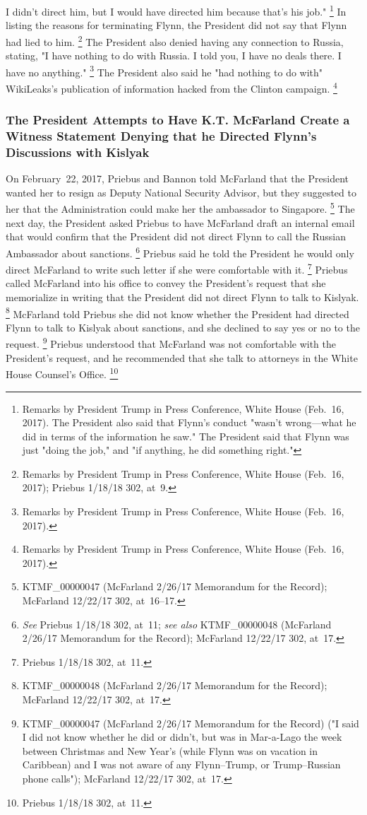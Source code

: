 I didn't direct him, but I would have directed him because that's his job."%
\footnote{Remarks by President Trump in Press Conference, White House (Feb.~16, 2017).
The President also said that Flynn's conduct "wasn't wrong---what he did in terms of the information he saw."
The President said that Flynn was just "doing the job," and "if anything, he did something right."}
In listing the reasons for terminating Flynn, the President did not say that Flynn had lied to him.%
\footnote{Remarks by President Trump in Press Conference, White House (Feb.~16, 2017);
Priebus 1/18/18 302, at~9.}
The President also denied having any connection to Russia, stating, "I have nothing to do with Russia.
I told you, I have no deals there.
I have no anything."%
\footnote{Remarks by President Trump in Press Conference, White House (Feb.~16, 2017).}
The President also said he "had nothing to do with" WikiLeaks's publication of information hacked from the Clinton campaign.%
\footnote{Remarks by President Trump in Press Conference, White House (Feb.~16, 2017).}

\subsubsection{The President Attempts to Have K.T. McFarland Create a Witness Statement Denying that he Directed Flynn's Discussions with Kislyak}

On February~22, 2017, Priebus and Bannon told McFarland that the President wanted her to resign as Deputy National Security Advisor, but they suggested to her that the Administration could make her the ambassador to Singapore.%
\footnote{KTMF\_00000047 (McFarland 2/26/17 Memorandum for the Record);
McFarland 12/22/17 302, at~16--17.}
The next day, the President asked Priebus to have McFarland draft an internal email that would confirm that the President did not direct Flynn to call the Russian Ambassador about sanctions.%
\footnote{\textit{See} Priebus 1/18/18 302, at~11;
\textit{see also} KTMF\_00000048 (McFarland 2/26/17 Memorandum for the Record);
McFarland 12/22/17 302, at~17.}
Priebus said he told the President he would only direct McFarland to write such letter if she were comfortable with it.%
\footnote{Priebus 1/18/18 302, at~11.}
Priebus called McFarland into his office to convey the President's request that she memorialize in writing that the President did not direct Flynn to talk to Kislyak.%
\footnote{KTMF\_00000048 (McFarland 2/26/17 Memorandum for the Record);
McFarland 12/22/17 302, at~17.}
McFarland told Priebus she did not know whether the President had directed Flynn to talk to Kislyak about sanctions, and she declined to say yes or no to the request.%
\footnote{KTMF\_00000047 (McFarland 2/26/17 Memorandum for the Record) ("I said I did not know whether he did or didn't, but was in Mar-a-Lago the week between Christmas and New Year's (while Flynn was on vacation in Caribbean) and I was not aware of any Flynn--Trump, or Trump--Russian phone calls");
McFarland 12/22/17 302, at~17.}
Priebus understood that McFarland was not comfortable with the President's request, and he recommended that she talk to attorneys in the White House Counsel's Office.%
\footnote{Priebus 1/18/18 302, at~11.}


